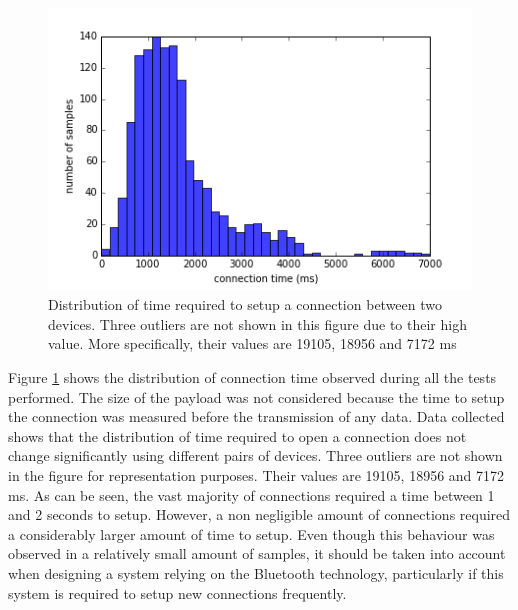 \begin{figure}[ht!]
  \centering
  \includegraphics[width=1.0\textwidth]{application/img/setup_distribution.png}
  \caption{Distribution of time required to setup a connection between two devices. Three outliers are not shown in this figure due to their high value. More specifically, their values are 19105, 18956 and 7172 ms}
  \label{figure:conn_time_distribution}
\end{figure}

Figure \ref{figure:conn_time_distribution} shows the distribution of connection time observed during all the tests performed.
The size of the payload was not considered because the time to setup the connection was measured before the transmission of any data. 
Data collected shows that the distribution of time required to open a connection does not change significantly using different pairs of devices.
Three outliers are not shown in the figure for representation purposes. Their values are 19105, 18956 and 7172 ms.
As can be seen, the vast majority of connections required a time between 1 and 2 seconds to setup.
However, a non negligible amount of connections required a considerably larger amount of time to setup.
Even though this behaviour was observed in a relatively small amount of samples, it should be taken into account when designing a system relying on the Bluetooth technology, particularly if this system is required to setup new connections frequently.